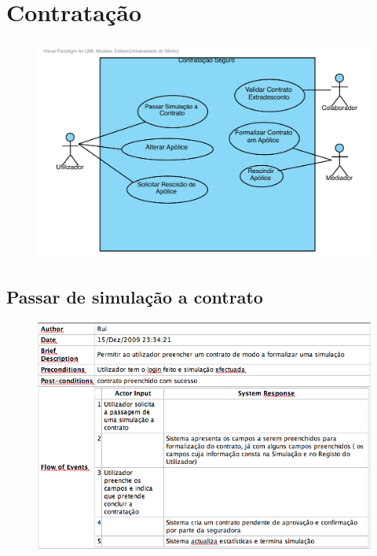 \section{Contratação}
\begin{figure}[!htb]
	\centering
	\includegraphics[scale=0.7]{images/Prints/Contratacao/Contratacao.pdf}
\end{figure}

\pagebreak

\subsection{Passar de simulação a contrato}
\begin{figure}[!htb]
	\centering
	\includegraphics[scale=0.7]{images/Prints/Contratacao/PassarSimulacaoContrato.png} 
\end{figure}

